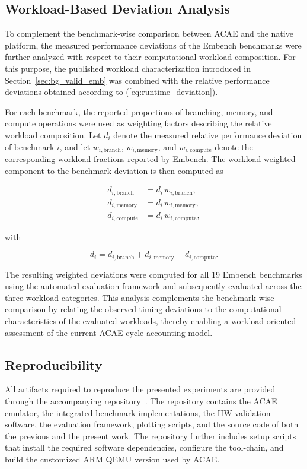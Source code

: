 \documentclass[conference]{IEEEtran}
\begin{document}
		\subsection{Workload-Based Deviation Analysis}
			\label{sec:meth_workload}

			To complement the benchmark-wise comparison between \ac{ACAE} and the native platform, the measured performance deviations of the Embench benchmarks were further analyzed with respect to their computational workload composition.
			For this purpose, the published workload characterization introduced in Section~\ref{sec:bg_valid_emb} was combined with the relative performance deviations obtained according to (\ref{eq:runtime_deviation}).

			For each benchmark, the reported proportions of branching, memory, and compute operations were used as weighting factors describing the relative workload composition.
			Let $d_i$ denote the measured relative performance deviation of benchmark $i$, and let $w_{i,\mathrm{branch}}$, $w_{i,\mathrm{memory}}$, and $w_{i,\mathrm{compute}}$ denote the corresponding workload fractions reported by Embench.
			The workload-weighted component to the benchmark deviation is then computed as

			\begin{align}
				d_{i,\mathrm{branch}} &= d_i \, w_{i,\mathrm{branch}},\\
				d_{i,\mathrm{memory}} &= d_i \, w_{i,\mathrm{memory}},\\
				d_{i,\mathrm{compute}} &= d_i \, w_{i,\mathrm{compute}},
			\end{align}

			with

			\begin{equation}
			d_i =
			d_{i,\mathrm{branch}}
			+
			d_{i,\mathrm{memory}}
			+
			d_{i,\mathrm{compute}}.
			\end{equation}
			
			The resulting weighted deviations were computed for all 19 Embench benchmarks using the automated evaluation framework and subsequently evaluated across the three workload categories.
			This analysis complements the benchmark-wise comparison by relating the observed timing deviations to the computational characteristics of the evaluated workloads, thereby enabling a workload-oriented assessment of the current \ac{ACAE} cycle accounting model.

		\subsection{Reproducibility}
			\label{sec:meth_reproducibility}
			All artifacts required to reproduce the presented experiments are provided through the accompanying repository~\cite{ACAE-REPO}.
			The repository contains the \ac{ACAE} emulator, the integrated benchmark implementations, the \ac{HW} validation software, the evaluation framework, plotting scripts, and the source code of both the previous and the present work.
			The repository further includes setup scripts that install the required software dependencies, configure the tool-chain, and build the customized ARM QEMU version used by \ac{ACAE}.
			
\end{document}
